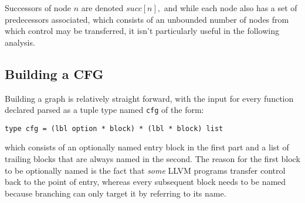 \documentclass{article}
\begin{document}
Successors of node \(n\) are denoted \( \mathit{succ}[n], \)
and while each node also has a set of predecessors associated, which consists of an  unbounded number of nodes from which control may be transferred, it isn't particularly useful in the following analysis.













\subsection{Building a CFG}




Building a graph is relatively straight forward, with the input for every function declared parsed as a tuple type named \texttt{cfg}  of the form:
\begin{verbatim}
type cfg = (lbl option * block) * (lbl * block) list
\end{verbatim}
which consists of an optionally named entry block in the first part and a list of trailing blocks that are always named in the second. The reason for the first block to be optionally named is the fact that \textit{some} LLVM programs transfer control back to the point of entry, whereas every subsequent block needs to be named because branching can only target it by referring to its name.
\end{document}
